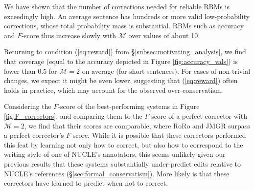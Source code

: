 \documentclass[letterpaper, 11pt]{article}
\begin{document}
We have shown that the number of corrections needed for reliable RBMs is exceedingly high.
An average sentence has hundreds or more valid low-probability corrections, whose total probability mass is substantial. 
RBMs such as accuracy and $F$-score thus increase slowly with $\mathcal{M}$ over values of about 10.

%
%
%

Returning to condition (\ref{eq:reward}) from \S\ref{subsec:motivating_analysis}, we find that coverage (equal to the accuracy depicted in Figure \ref{fig:accuracy_vals}) is lower than 0.5 for $\mathcal{M}=2$ on average (for short sentences). For cases of non-trivial changes, we expect it might be even lower, suggesting that (\ref{eq:reward}) often holds in practice, which may account for the observed over-conservatism.

Considering the $F$-score of the best-performing systems in Figure \ref{fig:F_correctors}, and comparing them to the $F$-score of a perfect corrector with $\mathcal{M}=2$, we find that their scores are comparable, where RoRo and JMGR surpass a perfect corrector's $F$-score.
While it is possible that these correctors performed this feat by learning not only how to correct, but also how to correspond to the writing style of one of NUCLE's annotators, this seems unlikely given our previous results that these systems substantially under-predict edits relative to NUCLE's references (\S\ref{sec:formal_conservatism}). 
More likely is that these correctors have learned to predict when not to correct.
\end{document}
